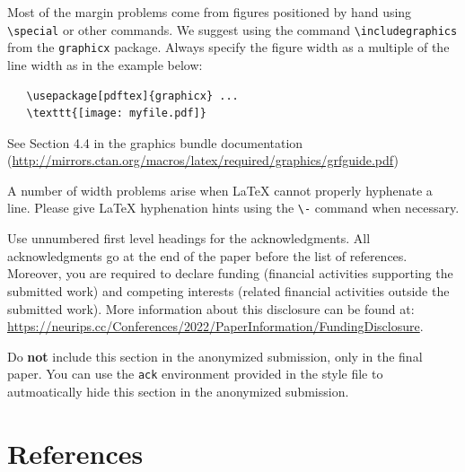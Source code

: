\documentclass{article}
\begin{document}
Most of the margin problems come from figures positioned by hand using
\verb+\special+ or other commands. We suggest using the command
\verb+\includegraphics+ from the \verb+graphicx+ package. Always specify the
figure width as a multiple of the line width as in the example below:
\begin{verbatim}
   \usepackage[pdftex]{graphicx} ...
   \texttt{[image: myfile.pdf]}
\end{verbatim}
See Section 4.4 in the graphics bundle documentation
(\url{http://mirrors.ctan.org/macros/latex/required/graphics/grfguide.pdf})


A number of width problems arise when \LaTeX{} cannot properly hyphenate a
line. Please give LaTeX hyphenation hints using the \verb+\-+ command when
necessary.


\begin{ack}
Use unnumbered first level headings for the acknowledgments. All acknowledgments
go at the end of the paper before the list of references. Moreover, you are required to declare
funding (financial activities supporting the submitted work) and competing interests (related financial activities outside the submitted work).
More information about this disclosure can be found at: \url{https://neurips.cc/Conferences/2022/PaperInformation/FundingDisclosure}.


Do {\bf not} include this section in the anonymized submission, only in the final paper. You can use the \texttt{ack} environment provided in the style file to autmoatically hide this section in the anonymized submission.
\end{ack}


\section*{References}
\end{document}
